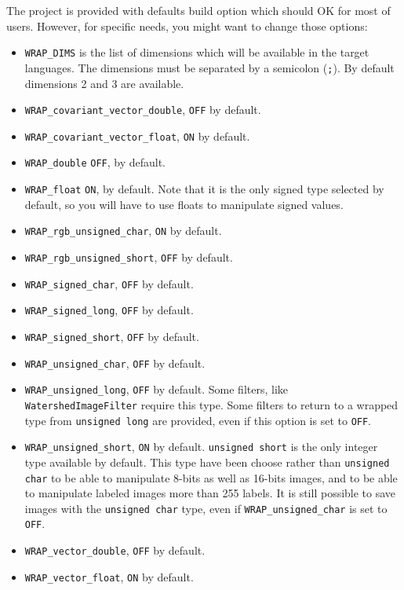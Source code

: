 \documentclass{InsightArticle}
\begin{document}
The project is provided with defaults build option which should OK for most of
users. However, for specific needs, you might want to change those options:
\begin{itemize}
  \item \verb$WRAP_DIMS$ is the list of dimensions which will be available in the
target languages. The dimensions must be separated by a semicolon (\verb$;$).
By default dimensions 2 and 3 are available.
  \item \verb$WRAP_covariant_vector_double$, \verb$OFF$ by default.
  \item \verb$WRAP_covariant_vector_float$, \verb$ON$ by default.
  \item \verb$WRAP_double$ \verb$OFF$, by default.
  \item \verb$WRAP_float$ \verb$ON$, by default. Note that it is the only signed
type selected by default, so you will have to use floats to manipulate signed
values.
  \item \verb$WRAP_rgb_unsigned_char$, \verb$ON$ by default.
  \item \verb$WRAP_rgb_unsigned_short$, \verb$OFF$ by default.
  \item \verb$WRAP_signed_char$, \verb$OFF$ by default.
  \item \verb$WRAP_signed_long$, \verb$OFF$ by default.
  \item \verb$WRAP_signed_short$, \verb$OFF$ by default.
  \item \verb$WRAP_unsigned_char$, \verb$OFF$ by default.
  \item \verb$WRAP_unsigned_long$, \verb$OFF$ by default. Some filters, like
\verb$WatershedImageFilter$ require this type. Some filters to return to a
wrapped type from \verb$unsigned long$ are provided, even if this option is
set to \verb$OFF$.
  \item \verb$WRAP_unsigned_short$, \verb$ON$ by default. \verb$unsigned short$
is the only integer type available by default. This type have been choose rather
than \verb$unsigned char$ to be able to manipulate 8-bits as well as 16-bits images,
and to be able to manipulate labeled images more than 255 labels. It is still
possible to save images with the \verb$unsigned char$ type, even if
\verb$WRAP_unsigned_char$ is set to \verb$OFF$.
  \item \verb$WRAP_vector_double$, \verb$OFF$ by default.
  \item \verb$WRAP_vector_float$, \verb$ON$ by default.

\end{itemize}
\end{document}
